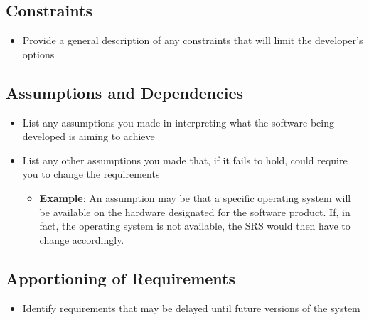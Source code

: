 \documentclass[]{article}
\begin{document}
\subsection{Constraints}
\label{sub:constraints}
\begin{itemize}
	\item Provide a general description of any constraints that will limit the developer's options
\end{itemize}

\subsection{Assumptions and Dependencies}
\label{sub:assumptions_and_dependencies}
\begin{itemize}
	\item List any assumptions you made in interpreting what the software being developed is aiming to achieve
	\item List any other assumptions you made that, if it fails to hold, could require you to change the requirements
	      \begin{itemize}
		      \item \textbf{Example}: An assumption may be that a specific operating system will be available on the hardware designated for the software product. If, in fact, the operating system is not available, the SRS would then have to change accordingly.
	      \end{itemize}
\end{itemize}

\subsection{Apportioning of Requirements}
\label{sub:apportioning_of_requirements}
\begin{itemize}
	\item Identify requirements that may be delayed until future versions of the system
\end{itemize}

\end{document}
